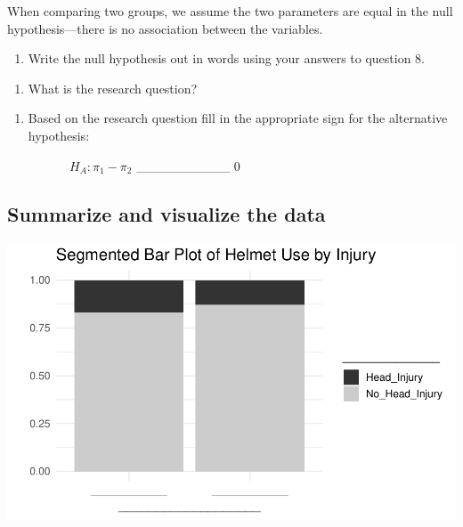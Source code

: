 \documentclass[
]{report}
\providecommand{\tightlist}{%
  \setlength{\itemsep}{0pt}\setlength{\parskip}{0pt}}
\begin{document}
When comparing two groups, we assume the two parameters are equal in the null hypothesis---there is no association between the variables.

\begin{enumerate}
\def\labelenumi{\arabic{enumi}.}
\setcounter{enumi}{8}
\tightlist
\item
  Write the null hypothesis out in words using your answers to question 8.
\end{enumerate}

\vspace{1in}

\begin{enumerate}
\def\labelenumi{\arabic{enumi}.}
\setcounter{enumi}{9}
\tightlist
\item
  What is the research question?
\end{enumerate}

\vspace{1in}

\begin{enumerate}
\def\labelenumi{\arabic{enumi}.}
\setcounter{enumi}{10}
\tightlist
\item
  Based on the research question fill in the appropriate sign for the alternative hypothesis:
  \vspace{0.25in}
\end{enumerate}

~~~~~~~~~~\(H_A: \pi_1 -\pi_2\) \_\_\_\_\_\_\_\_\_\_ 0

\hypertarget{summarize-and-visualize-the-data}{%
\subsection{Summarize and visualize the data}\label{summarize-and-visualize-the-data}}

\begin{center}\includegraphics[width=0.7\linewidth]{07-inference-2cat_files/figure-latex/unnamed-chunk-2-1} \end{center}
\end{document}
